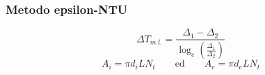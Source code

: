 \documentclass[a4paper,10pt]{article}                                                                                       %
\begin{document}
\subsubsection{Metodo epsilon-NTU}                                                                                          %
\label{subsubsec:ecf_epsilon_nut}                                                                                           %
\vspace{1mm}                                                                                                                %
\begin{equation}                                                                                                            %
  \label{eqn:deltatml}                                                                                                      %
  \Delta{T_{m.l.}} = \frac{\Delta_{1}-\Delta_{2}}{\log_e{\left(\frac{\Delta_{1}}{\Delta_{2}}\right)}}                       %
\end{equation}                                                                                                              %
\vspace{3mm}                                                                                                                %
\begin{equation}                                                                                                            %
  \label{eqn:surf}                                                                                                          %
  A_i = \pi d_iLN_t                                                                                                         %
  \qquad\text{ed}\qquad                                                                                                     %
  A_e = \pi d_eLN_t                                                                                                         %
\end{equation}                                                                                                              %
\vspace{3mm}                                                                                                                %
\end{document}
